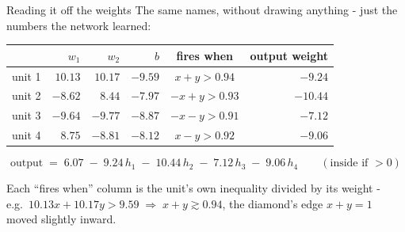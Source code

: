 \documentclass[aspectratio=169]{beamer}
\begin{document}
\begin{frame}{Reading it off the weights}
  \vspace{0.2em}
  The same names, without drawing anything - just the numbers the network learned:

  \vspace{0.4em}
  \begin{center}
  \small
  \begin{tabular}{@{}lrrrcr@{}}
    \toprule
    & $w_1$ & $w_2$ & $b$ & fires when & \textbf{output weight}\\
    \midrule
    unit 1 & $10.13$ & $10.17$ & $-9.59$ & $x + y > 0.94$ & $-9.24$\\
    unit 2 & $-8.62$ & $8.44$ & $-7.97$ & $-x + y > 0.93$ & $-10.44$\\
    unit 3 & $-9.64$ & $-9.77$ & $-8.87$ & $-x - y > 0.91$ & $-7.12$\\
    unit 4 & $8.75$ & $-8.81$ & $-8.12$ & $x - y > 0.92$ & $-9.06$\\
    \bottomrule
  \end{tabular}
  \end{center}

  \vspace{0.3em}
  \[
    \text{output} \;=\; 6.07 \;-\; 9.24\,h_1 \;-\; 10.44\,h_2 \;-\; 7.12\,h_3 \;-\; 9.06\,h_4
    \qquad(\text{inside if } > 0)
  \]

  \vspace{0.2em}
  {\small Each ``fires when'' column is the unit's own inequality divided by its weight - e.g.\
  $10.13x + 10.17y > 9.59 \;\Rightarrow\; x + y \gtrsim 0.94$, the diamond's edge $x + y = 1$ moved
  slightly inward.}
\end{frame}
\end{document}
